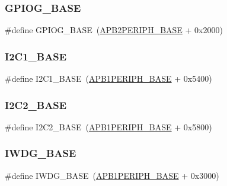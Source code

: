 \subsubsection{\texorpdfstring{GPIOG\_BASE}{GPIOG\_BASE}}
{\footnotesize\ttfamily \#define G\+P\+I\+O\+G\+\_\+\+B\+A\+SE~(\mbox{\hyperlink{group___peripheral__memory__map_ga25b99d6065f1c8f751e78f43ade652cb}{A\+P\+B2\+P\+E\+R\+I\+P\+H\+\_\+\+B\+A\+SE}} + 0x2000)}

\mbox{\label{group___peripheral__memory__map_gacd72dbffb1738ca87c838545c4eb85a3}} 
\subsubsection{\texorpdfstring{I2C1\_BASE}{I2C1\_BASE}}
{\footnotesize\ttfamily \#define I2\+C1\+\_\+\+B\+A\+SE~(\mbox{\hyperlink{group___peripheral__memory__map_ga45666d911f39addd4c8c0a0ac3388cfb}{A\+P\+B1\+P\+E\+R\+I\+P\+H\+\_\+\+B\+A\+SE}} + 0x5400)}

\mbox{\label{group___peripheral__memory__map_ga04bda70f25c795fb79f163b633ad4a5d}} 
\subsubsection{\texorpdfstring{I2C2\_BASE}{I2C2\_BASE}}
{\footnotesize\ttfamily \#define I2\+C2\+\_\+\+B\+A\+SE~(\mbox{\hyperlink{group___peripheral__memory__map_ga45666d911f39addd4c8c0a0ac3388cfb}{A\+P\+B1\+P\+E\+R\+I\+P\+H\+\_\+\+B\+A\+SE}} + 0x5800)}

\mbox{\label{group___peripheral__memory__map_ga8543ee4997296af5536b007cd4748f55}} 
\subsubsection{\texorpdfstring{IWDG\_BASE}{IWDG\_BASE}}
{\footnotesize\ttfamily \#define I\+W\+D\+G\+\_\+\+B\+A\+SE~(\mbox{\hyperlink{group___peripheral__memory__map_ga45666d911f39addd4c8c0a0ac3388cfb}{A\+P\+B1\+P\+E\+R\+I\+P\+H\+\_\+\+B\+A\+SE}} + 0x3000)}

